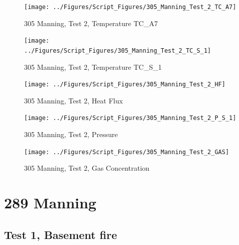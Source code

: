 \documentclass[12pt,oneside]{book}
\begin{document}
\begin{figure}[!ht]
\texttt{[image: ../Figures/Script\_Figures/305\_Manning\_Test\_2\_TC\_A7]}
\caption{305 Manning, Test 2, Temperature TC\_A7}
\label{fig:305_Manning_Test_2_TC_A7}
\end{figure}

\begin{figure}[!ht]
\texttt{[image: ../Figures/Script\_Figures/305\_Manning\_Test\_2\_TC\_S\_1]}
\caption{305 Manning, Test 2, Temperature TC\_S\_1}
\label{fig:305_Manning_Test_2_TC_S_1}
\end{figure}

\begin{figure}[!ht]
\texttt{[image: ../Figures/Script\_Figures/305\_Manning\_Test\_2\_HF]}
\caption{305 Manning, Test 2, Heat Flux}
\label{fig:305_Manning_Test_2_HF}
\end{figure}

\begin{figure}[!ht]
\texttt{[image: ../Figures/Script\_Figures/305\_Manning\_Test\_2\_P\_S\_1]}
\caption{305 Manning, Test 2, Pressure}
\label{fig:305_Manning_Test_2_P_S_1}
\end{figure}

\begin{figure}[!ht]
\texttt{[image: ../Figures/Script\_Figures/305\_Manning\_Test\_2\_GAS]}
\caption{305 Manning, Test 2, Gas Concentration}
\label{fig:305_Manning_Test_2_GAS}
\end{figure}







\clearpage


\section{289 Manning}

\subsection{Test 1, Basement fire}
\end{document}
